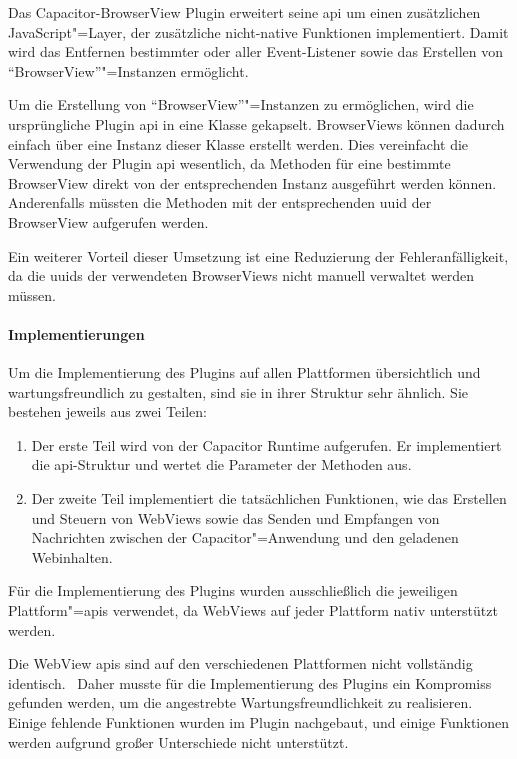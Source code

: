 Das Capacitor-BrowserView Plugin erweitert seine \ac{api} um einen zusätzlichen JavaScript"=Layer, der zusätzliche nicht-native Funktionen implementiert.
Damit wird das Entfernen bestimmter oder aller Event-Listener sowie das Erstellen von \enquote{BrowserView}"=Instanzen ermöglicht.

Um die Erstellung von \enquote{BrowserView}"=Instanzen zu ermöglichen, wird die ursprüngliche Plugin \ac{api} in eine Klasse gekapselt.
BrowserViews können dadurch einfach über eine Instanz dieser Klasse erstellt werden.
Dies vereinfacht die Verwendung der Plugin \ac{api} wesentlich, da Methoden für eine bestimmte BrowserView direkt von der entsprechenden Instanz ausgeführt werden können.
Anderenfalls müssten die Methoden mit der entsprechenden \ac{uuid} der BrowserView aufgerufen werden.

Ein weiterer Vorteil dieser Umsetzung ist eine Reduzierung der Fehleranfälligkeit, da die \acp{uuid} der verwendeten BrowserViews nicht manuell verwaltet werden müssen.

\newpage

\paragraph{Implementierungen}

Um die Implementierung des Plugins auf allen Plattformen übersichtlich und wartungsfreundlich zu gestalten, sind sie in ihrer Struktur sehr ähnlich.
Sie bestehen jeweils aus zwei Teilen:

\begin{enumerate}
  \item 
  Der erste Teil wird von der Capacitor Runtime aufgerufen.
  Er implementiert die \acs{api}-Struktur und wertet die Parameter der Methoden aus.
  \item
  Der zweite Teil implementiert die tatsächlichen Funktionen, wie das Erstellen und Steuern von WebViews
  sowie das Senden und Empfangen von Nachrichten zwischen der Capacitor"=Anwendung und den geladenen Webinhalten.
\end{enumerate}

Für die Implementierung des Plugins wurden ausschließlich die jeweiligen Plattform"=\acsp{api} verwendet, da WebViews auf jeder Plattform nativ unterstützt werden.
\cite{android:api, ios:api, electron:docs}

Die WebView \acsp{api} sind auf den verschiedenen Plattformen nicht vollständig identisch.~\cite{android:api, electron:docs}
Daher musste für die Implementierung des Plugins ein Kompromiss gefunden werden, um die angestrebte Wartungsfreundlichkeit zu realisieren.
Einige fehlende Funktionen wurden im Plugin nachgebaut, und einige Funktionen werden aufgrund großer Unterschiede nicht unterstützt.

